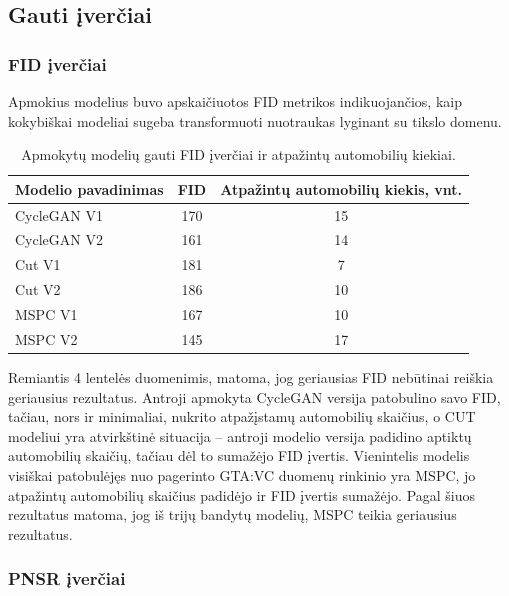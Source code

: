 \documentclass{VUMIFPSbakalaurinis}
\begin{document}
    
    \subsection{Gauti įverčiai}
        \subsubsection{FID įverčiai}
            Apmokius modelius buvo apskaičiuotos FID metrikos indikuojančios, kaip kokybiškai modeliai sugeba transformuoti nuotraukas lyginant su tikslo domenu.
            \begin{table}[H]
                \footnotesize
                \centering
                \caption{Apmokytų modelių gauti FID įverčiai ir atpažintų automobilių kiekiai.}
                {\begin{tabular}{|l|c|c|} \hline
                    Modelio pavadinimas & FID & Atpažintų automobilių kiekis, vnt.\\
                    \hline
                    CycleGAN V1 & 170 & 15\\
                    CycleGAN V2 & 161 & 14\\
                    Cut V1 & 181 & 7\\
                    Cut V2 & 186 & 10\\ 
                    MSPC V1 & 167 & 10\\
                    MSPC V2 & 145 & 17\\
                    \hline
                    \end{tabular}
                }
                \label{tab:table example}
            \end{table}
    
            Remiantis 4 lentelės duomenimis, matoma, jog geriausias FID nebūtinai reiškia geriausius rezultatus. Antroji apmokyta CycleGAN versija patobulino savo FID, tačiau, nors ir minimaliai, nukrito atpažįstamų automobilių skaičius, o CUT modeliui yra atvirkštinė situacija – antroji modelio versija padidino aptiktų automobilių skaičių, tačiau dėl to sumažėjo FID įvertis. Vienintelis modelis visiškai patobulėjęs nuo pagerinto GTA:VC duomenų rinkinio yra MSPC, jo atpažintų automobilių skaičius padidėjo ir FID įvertis sumažėjo. Pagal šiuos rezultatus matoma, jog iš trijų bandytų modelių, MSPC teikia geriausius rezultatus.
        \subsubsection{PNSR įverčiai}
        
\end{document}
